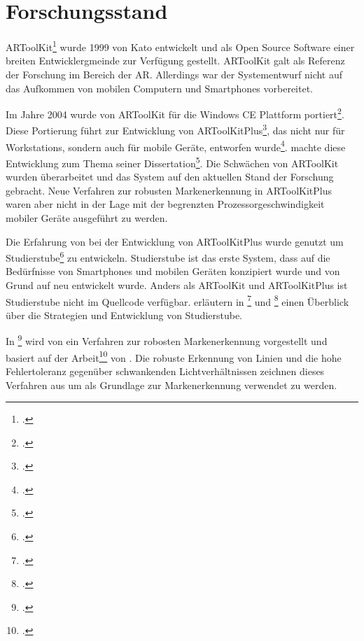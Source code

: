 \section{Forschungsstand} %
\label{sec:forschungsstand}
\begin{comment}
	Forschungsstand: Alle untersuchten Arbeiten aufführen und kurz erklären.
\end{comment}

ARToolKit\footcite{artoolkit} wurde 1999 von Kato entwickelt und als Open Source Software einer breiten
 Entwicklergmeinde zur Verfügung gestellt. ARToolKit galt als Referenz der Forschung im Bereich der \gls{AR}.
 Allerdings war der Systementwurf nicht auf das Aufkommen von mobilen Computern und Smartphones vorbereitet.

Im Jahre 2004 wurde von \citeauthor{wagner04} ARToolKit für die Windows CE Plattform portiert\footcite{wagner04}. Diese
 Portierung führt zur Entwicklung von ARToolKitPlus\footcite{artoolkitplus}, das nicht nur für Workstations, sondern
 auch für mobile Geräte, entworfen wurde\footcite{wagner07b}. \citeauthor{wagner07a} machte diese Entwicklung zum Thema
 seiner Dissertation\footcite{wagner07a}. Die Schwächen von ARToolKit wurden überarbeitet und das System auf den
 aktuellen Stand der Forschung gebracht. Neue Verfahren zur robusten Mar\-ken\-er\-kennung in ARToolKitPlus waren aber
 nicht in der Lage mit der begrenzten Prozessorgeschwindigkeit mobiler Geräte ausgeführt zu werden.

Die Erfahrung von \citeauthor{wagner04} bei der Entwicklung von ARToolKitPlus wurde genutzt um
 Studierstube\footcite{studierstube} zu entwickeln. Studierstube ist das erste System, dass auf die Bedürfnisse von
 Smartphones und mobilen Geräten konzipiert wurde und von Grund auf neu entwickelt wurde. Anders als ARToolKit und
 ARToolKitPlus ist Studierstube nicht im Quellcode verfügbar.
\citeauthor{wagner09a} erläutern in \footcite{wagner09a} und
 \footcite{wagner09b} einen Überblick über die Strategien und Entwicklung von Studierstube.

In \footcite{hirzer08} wird von \citeauthor{hirzer08} ein Verfahren zur robosten Markenerkennung
 vorgestellt und basiert auf der Arbeit\footcite{clarke96} von \citeauthor{clarke96}. Die robuste Erkennung von Linien
 und die hohe Fehlertoleranz gegenüber schwankenden Lichtverhältnissen zeichnen dieses Verfahren aus um als Grundlage
 zur Markenerkennung verwendet zu werden.

